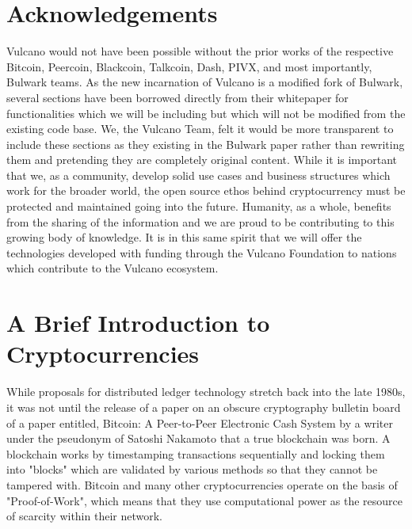 \documentclass[A4paper, 12pt]{article}
\begin{document}
\section{Acknowledgements}
Vulcano would not have been possible without the prior works of the respective Bitcoin, Peercoin, Blackcoin, Talkcoin, Dash, PIVX, and most importantly, Bulwark teams. As the new incarnation of Vulcano is a modified fork of Bulwark, several sections have been borrowed directly from their whitepaper for functionalities which we will be including but which will not be modified from the existing code base. We, the Vulcano Team, felt it would be more transparent to include these sections as they existing in the Bulwark paper rather than rewriting them and pretending they are completely original content. While it is important that we, as a community, develop solid use cases and business structures which work for the broader world, the open source ethos behind cryptocurrency must be protected and maintained going into the future. Humanity, as a whole, benefits from the sharing of the information and we are proud to be contributing to this growing body of knowledge. It is in this same spirit that we will offer the technologies developed with funding through the Vulcano Foundation to nations which contribute to the Vulcano ecosystem. 

\section{A Brief Introduction to Cryptocurrencies}
While proposals for distributed ledger technology stretch back into the late 1980s, it was not until the release of a paper on an obscure cryptography bulletin board of a paper entitled, Bitcoin: A Peer-to-Peer Electronic Cash System by a writer under the pseudonym of Satoshi Nakamoto that a true blockchain was born. A blockchain works by timestamping transactions sequentially and locking them into "blocks" which are validated by various methods so that they cannot be tampered with. Bitcoin and many other cryptocurrencies operate on the basis of "Proof-of-Work", which means that they use computational power as the resource of scarcity within their network.
 
\end{document}

